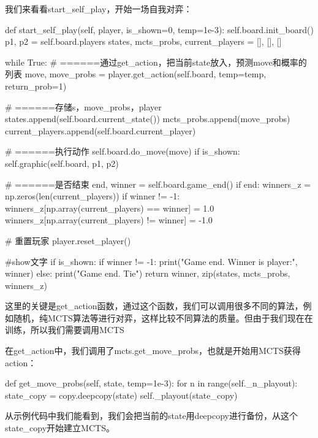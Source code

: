 \documentclass[12pt]{article}
\begin{document}
我们来看看start\_self\_play，开始一场自我对弈：
\begin{python}
def start_self_play(self, player, is_shown=0, temp=1e-3):
        self.board.init_board()
        p1, p2 = self.board.players
        states, mcts_probs, current_players = [], [], []

        while True:
            # ======通过get_action，把当前state放入，预测move和概率的列表
            move, move_probs = player.get_action(self.board,
                                                 temp=temp,
                                                 return_prob=1)

            # ======存储s，move_probs，player
            states.append(self.board.current_state())
            mcts_probs.append(move_probs)
            current_players.append(self.board.current_player)

            # ======执行动作
            self.board.do_move(move)
            if is_shown:
                self.graphic(self.board, p1, p2)

            # ======是否结束
            end, winner = self.board.game_end()
            if end:
                winners_z = np.zeros(len(current_players))
                if winner != -1:
                    winners_z[np.array(current_players) == winner] = 1.0
                    winners_z[np.array(current_players) != winner] = -1.0

                # 重置玩家
                player.reset_player()

                #show文字
                if is_shown:
                    if winner != -1:
                        print("Game end. Winner is player:", winner)
                    else:
                        print("Game end. Tie")
                return winner, zip(states, mcts_probs, winners_z)
\end{python}

这里的关键是get\_action函数，通过这个函数，我们可以调用很多不同的算法，例如随机，纯MCTS算法等进行对弈，这样比较不同算法的质量。但由于我们现在在训练，所以我们需要调用MCTS

在get\_action中，我们调用了mcts.get\_move\_probs，也就是开始用MCTS获得action：
\begin{python}
def get_move_probs(self, state, temp=1e-3):
    for n in range(self._n_playout):
        state_copy = copy.deepcopy(state)
        self._playout(state_copy)
\end{python}

从示例代码中我们能看到，我们会把当前的state用deepcopy进行备份，从这个state\_copy开始建立MCTS。
\end{document}
